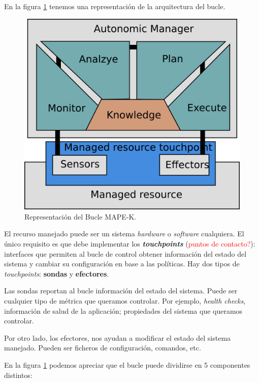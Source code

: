 En la figura \ref{fig:bucle-mapek} tenemos una representación de la arquitectura del bucle.

\begin{figure}[h]
  \centering
  \includegraphics[scale=0.6]{01_introduccion/images/bucle-mape-k}
  \caption[Representación del Bucle MAPE-K]{Representación del Bucle MAPE-K. \cite{brunEngineeringSelfAdaptiveSystems2009}}
  \label{fig:bucle-mapek}
\end{figure}


El recurso manejado puede ser un sistema \emph{hardware} o \emph{software} cualquiera. El único requisito es que debe implementar los \textbf{\emph{touchpoints}} (\textcolor{red}{puntos de contacto?}): interfaces que permiten al bucle de control obtener información del estado del sistema y cambiar su configuración en base a las políticas. Hay dos tipos de \emph{touchpoints}: \textbf{sondas} y \textbf{efectores}.

Las sondas reportan al bucle información del estado del sistema. Puede ser cualquier tipo de métrica que queramos controlar. Por ejemplo, \emph{health checks}, información de salud de la aplicación; propiedades del sistema que queramos controlar.

Por otro lado, los efectores, nos ayudan a modificar el estado del sistema manejado. Pueden ser ficheros de configuración, comandos, etc.

En la figura \ref{fig:bucle-mapek} podemos apreciar que el bucle puede dividirse en 5 componentes distintos: \cite{ArchitecturalBlueprintAutonomic2006}

